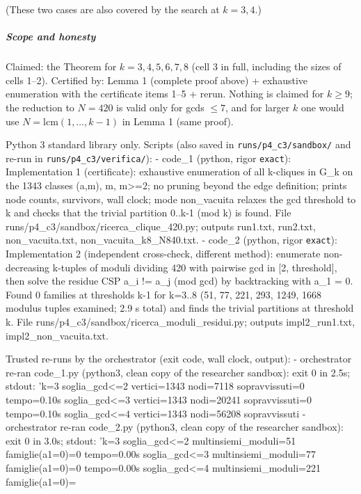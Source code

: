 (These two cases are also covered by the search at \(k=3,4\).)

\subparagraph{Scope and honesty}\label{scope-and-honesty}

Claimed: the Theorem for \(k=3,4,5,6,7,8\) (cell 3 in full, including
the sizes of cells 1--2). Certified by: Lemma 1 (complete proof above) +
exhaustive enumeration with the certificate items 1--5 + rerun. Nothing
is claimed for \(k\ge9\); the reduction to \(N=420\) is valid only for
gcds \(\le7\), and for larger \(k\) one would use
\(N=\mathrm{lcm}(1,\dots,k-1)\) in Lemma 1 (same proof).


Python 3 standard library only. Scripts (also saved in
\texttt{runs/p4\_c3/sandbox/} and re-run in
\texttt{runs/p4\_c3/verifica/}): - code\_1 (python, rigor
\texttt{exact}): Implementation 1 (certificate): exhaustive enumeration
of all k-cliques in G\_k on the 1343 classes (a,m), m,
m\textgreater=2; no pruning beyond the edge definition; prints node
counts, survivors, wall clock; mode non\_vacuita relaxes the gcd
threshold to k and checks that the trivial partition 0..k-1 (mod k) is
found. File runs/p4\_c3/sandbox/ricerca\_clique\_420.py; outputs
run1.txt, run2.txt, non\_vacuita.txt, non\_vacuita\_k8\_N840.txt. -
code\_2 (python, rigor \texttt{exact}): Implementation 2 (independent
cross-check, different method): enumerate non-decreasing k-tuples of
moduli dividing 420 with pairwise gcd in {[}2, threshold{]}, then solve
the residue CSP a\_i != a\_j (mod gcd) by backtracking with a\_1 = 0.
Found 0 families at thresholds k-1 for k=3..8 (51, 77, 221, 293, 1249,
1668 modulus tuples examined; 2.9 s total) and finds the trivial
partitions at threshold k. File
runs/p4\_c3/sandbox/ricerca\_moduli\_residui.py; outputs
impl2\_run1.txt, impl2\_non\_vacuita.txt.

Trusted re-runs by the orchestrator (exit code, wall clock, output): -
orchestrator re-ran code\_1.py (python3, clean copy of the researcher
sandbox): exit 0 in 2.5s; stdout: 'k=3 soglia\_gcd\textless=2
vertici=1343 nodi=7118 sopravvissuti=0 tempo=0.10s
soglia\_gcd\textless=3 vertici=1343 nodi=20241 sopravvissuti=0
tempo=0.10s soglia\_gcd\textless=4 vertici=1343 nodi=56208
sopravvissuti - orchestrator re-ran code\_2.py (python3, clean copy of
the researcher sandbox): exit 0 in 3.0s; stdout: 'k=3
soglia\_gcd\textless=2 multinsiemi\_moduli=51 famiglie(a1=0)=0
tempo=0.00s soglia\_gcd\textless=3 multinsiemi\_moduli=77
famiglie(a1=0)=0 tempo=0.00s soglia\_gcd\textless=4
multinsiemi\_moduli=221 famiglie(a1=0)=


